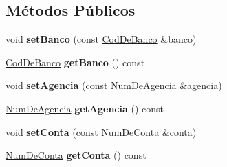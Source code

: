 \subsection*{Métodos Públicos}
\begin{DoxyCompactItemize}
\item 
void {\bfseries set\+Banco} (const \hyperlink{classshibarides_1_1CodDeBanco}{Cod\+De\+Banco} \&banco)\hypertarget{classshibarides_1_1Conta_a9300f2180e88b9df87343193c926badf}{}\label{classshibarides_1_1Conta_a9300f2180e88b9df87343193c926badf}

\item 
\hyperlink{classshibarides_1_1CodDeBanco}{Cod\+De\+Banco} {\bfseries get\+Banco} () const \hypertarget{classshibarides_1_1Conta_a40bb0d5f152f61b26a7bd6174af1124f}{}\label{classshibarides_1_1Conta_a40bb0d5f152f61b26a7bd6174af1124f}

\item 
void {\bfseries set\+Agencia} (const \hyperlink{classshibarides_1_1NumDeAgencia}{Num\+De\+Agencia} \&agencia)\hypertarget{classshibarides_1_1Conta_a53957be04cf0cd5a7fb783c7d320aa74}{}\label{classshibarides_1_1Conta_a53957be04cf0cd5a7fb783c7d320aa74}

\item 
\hyperlink{classshibarides_1_1NumDeAgencia}{Num\+De\+Agencia} {\bfseries get\+Agencia} () const \hypertarget{classshibarides_1_1Conta_a4131ed3a711e4dd69a9adf3f66cb9abc}{}\label{classshibarides_1_1Conta_a4131ed3a711e4dd69a9adf3f66cb9abc}

\item 
void {\bfseries set\+Conta} (const \hyperlink{classshibarides_1_1NumDeConta}{Num\+De\+Conta} \&conta)\hypertarget{classshibarides_1_1Conta_ac04fa978221a3b76cd64878ad6853dc7}{}\label{classshibarides_1_1Conta_ac04fa978221a3b76cd64878ad6853dc7}

\item 
\hyperlink{classshibarides_1_1NumDeConta}{Num\+De\+Conta} {\bfseries get\+Conta} () const \hypertarget{classshibarides_1_1Conta_a0f18603982a99ab28e89207ed6bbe96c}{}\label{classshibarides_1_1Conta_a0f18603982a99ab28e89207ed6bbe96c}

\end{DoxyCompactItemize}
